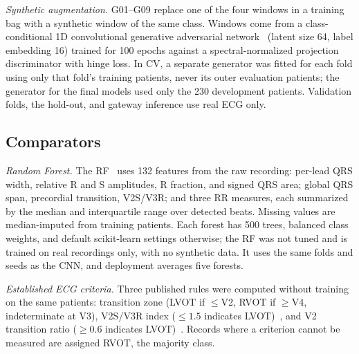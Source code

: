 \documentclass[conference,a4paper]{IEEEtran}
\begin{document}
\emph{Synthetic augmentation.} G01--G09 replace one of the four windows in a training bag with a synthetic window of the same class. Windows come from a class-conditional 1D convolutional generative adversarial network~\cite{mirza2014} (latent size 64, label embedding 16) trained for 100 epochs against a spectral-normalized projection discriminator with hinge loss. In CV, a separate generator was fitted for each fold using only that fold's training patients, never its outer evaluation patients; the generator for the final models used only the 230 development patients. Validation folds, the hold-out, and gateway inference use real ECG only.

\subsection{Comparators}
\emph{Random Forest.} The RF~\cite{breiman2001} uses 132 features from the raw recording: per-lead QRS width, relative R and S amplitudes, R fraction, and signed QRS area; global QRS span, precordial transition, V2S/V3R; and three RR measures, each summarized by the median and interquartile range over detected beats. Missing values are median-imputed from training patients. Each forest has 500 trees, balanced class weights, and default scikit-learn settings otherwise; the RF was not tuned and is trained on real recordings only, with no synthetic data. It uses the same folds and seeds as the CNN, and deployment averages five forests.

\emph{Established ECG criteria.} Three published rules were computed without training on the same patients: transition zone (LVOT if $\le$V2, RVOT if $\ge$V4, indeterminate at V3), V2S/V3R index ($\le1.5$ indicates LVOT)~\cite{yoshida2014}, and V2 transition ratio ($\ge0.6$ indicates LVOT)~\cite{betensky2011}. Records where a criterion cannot be measured are assigned RVOT, the majority class.
\end{document}
